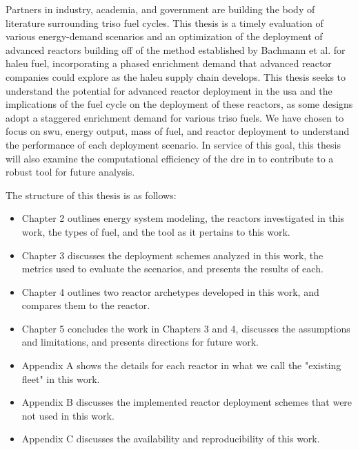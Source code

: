 Partners in industry, academia, and government are building the body of
literature surrounding \gls{triso} fuel cycles. This thesis is a timely
evaluation of various energy-demand scenarios and an optimization of the
deployment of advanced reactors building off of the method established by
Bachmann et al. \cite{bachmann_enrichment_2021} for \gls{haleu} fuel,
incorporating a phased enrichment demand that advanced reactor companies could
explore as the \gls{haleu} supply chain develops. This thesis seeks to
understand the potential for advanced reactor deployment in the \gls{usa} and
the implications of the fuel cycle on the deployment of these reactors, as some
designs adopt a staggered enrichment demand for various \gls{triso} fuels. We
have chosen to focus on \gls{swu}, energy output, mass of fuel, and reactor
deployment to understand the performance of each deployment scenario. In
service of this goal, this thesis will also examine the computational
efficiency of the \gls{dre} in \cyclus to contribute to a robust tool for
future analysis.


The structure of this thesis is as follows:

\begin{itemize}
    \item Chapter 2 outlines energy system modeling, the reactors investigated in this work, the types of fuel, and the \cyclus tool as it pertains to this work.
    \item Chapter 3 discusses the deployment schemes analyzed in this work, the metrics used to evaluate the scenarios, and presents the results of each.
    \item Chapter 4 outlines two reactor archetypes developed in this work, and compares them to the \cycamore reactor.
    \item Chapter 5 concludes the work in Chapters 3 and 4, discusses the assumptions and limitations, and presents directions for future work.
    \item Appendix A shows the details for each reactor in what we call the "existing fleet" in this work.
    \item Appendix B discusses the implemented reactor deployment schemes that were not used in this work.
    \item Appendix C discusses the availability and reproducibility of this work.
\end{itemize}